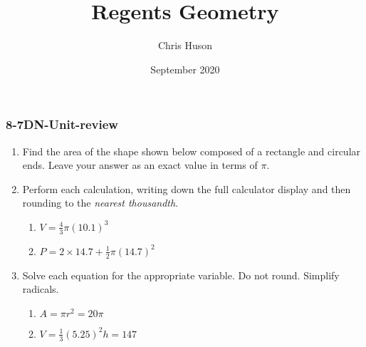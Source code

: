 \documentclass[12pt, twoside]{article}
\title{Regents Geometry}
\author{Chris Huson}
\date{September 2020}
\begin{document}
\subsubsection*{8-7DN-Unit-review}
\begin{enumerate}
\item Find the area of the shape shown below composed of a rectangle and circular ends. Leave your answer as an exact value in terms of $\pi$.
  \begin{flushright}
\end{flushright}\vspace{1cm}

\item Perform each calculation, writing down the full calculator display and then rounding to the \emph{nearest thousandth}.
\begin{multicols}{2}
\begin{enumerate}[itemsep=2cm]
  \item $V=\frac{4}{3} \pi (10.1)^3$
  \item $P=2 \times 14.7 + \frac{1}{2} \pi (14.7)^2$  
\end{enumerate}
\end{multicols}\vspace{3cm}

\item Solve each equation for the appropriate variable. Do not round. Simplify radicals.
\begin{multicols}{2}
\begin{enumerate}[itemsep=2cm]
  \item $A=\pi r^2=20\pi$
  \item $V=\frac{1}{3}(5.25)^2h=147$  
\end{enumerate}
\end{multicols}\vspace{2cm}

\newpage

\end{enumerate}
\end{document}
